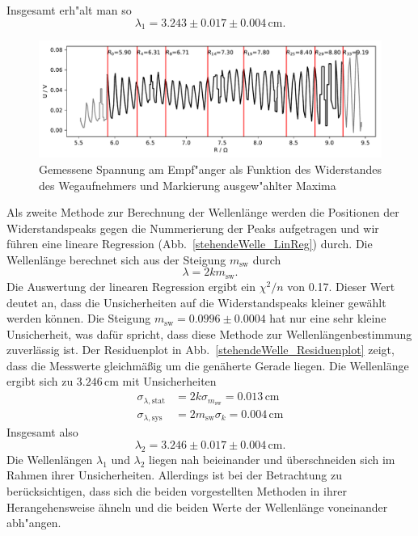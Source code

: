 \documentclass[12pt,a4paper]{article}
\begin{document}
Insgesamt erh"alt man so
\begin{equation}
\lambda_1=3.243\pm0.017\pm0.004\,\text{cm}.
\end{equation}
\begin{figure}
\centering
\includegraphics[scale=0.8]{Bilder/stehendeWelle.pdf}
\caption{Gemessene Spannung am Empf"anger als Funktion des Widerstandes des Wegaufnehmers und Markierung ausgew"ahlter Maxima}
\label{stehendeWelle}
\end{figure}Als zweite Methode zur Berechnung der Wellenlänge werden die Positionen der Widerstandspeaks gegen die Nummerierung der Peaks aufgetragen und wir führen eine lineare Regression (Abb.~\ref{stehendeWelle_LinReg}) durch. Die Wellenlänge berechnet sich aus der Steigung $m_{\text{sw}}$ durch
\begin{equation}
\lambda=2km_{\text{sw}}.
\end{equation}
Die Auswertung der linearen Regression ergibt ein $\chi^2/n$ von 0.17. Dieser Wert deutet an, dass die Unsicherheiten auf die Widerstandspeaks kleiner gewählt werden können. Die Steigung $m_{\text{sw}}=0.0996\pm0.0004$ hat nur eine sehr kleine Unsicherheit, was dafür spricht, dass diese Methode zur Wellenlängenbestimmung zuverlässig ist. Der Residuenplot in Abb.~\ref{stehendeWelle_Residuenplot} zeigt, dass die Messwerte gleichmäßig um die genäherte Gerade liegen.
Die Wellenlänge ergibt sich zu $3.246\,\text{cm}$ mit Unsicherheiten
\begin{align}
\sigma_{\lambda,\text{stat}}&=2k\sigma_{m_{\text{sw}}}=0.013\,\text{cm}\\
\sigma_{\lambda,\text{sys}}&=2m_{\text{sw}}\sigma_k=0.004\,\text{cm}
\end{align}
Insgesamt also
\begin{equation}
\lambda_2=3.246\pm0.017\pm0.004\,\text{cm}.
\end{equation}
Die Wellenlängen $\lambda_1$ und $\lambda_2$ liegen nah beieinander und überschneiden sich im Rahmen ihrer Unsicherheiten. Allerdings ist bei der Betrachtung zu berücksichtigen, dass sich die beiden vorgestellten Methoden in ihrer Herangehensweise ähneln und die beiden Werte der Wellenlänge voneinander abh"angen.
\end{document}
